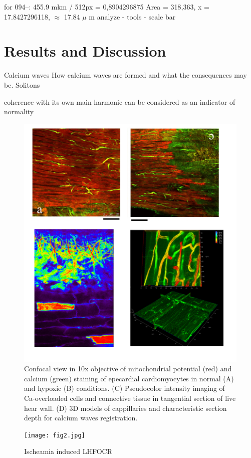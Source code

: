 \documentclass{biophys-new}
\begin{document}
for 094--: 455.9 mkm / 512px = 0,8904296875
Area = 318,363, x = 17.8427296118, $\approx$ 17.84 $\mu$ m
analyze - tools - scale bar


\section*{Results and Discussion}

Calcium waves
How calcium waves are formed and what the consequences may be.
Solitons

coherence with its own main harmonic can be considered as an indicator of normality

\begin{figure}[hbt!]
\centering
\includegraphics[width=0.8\linewidth]{fig1.png}
\caption{Confocal view in 10x objective of mitochondrial potential (red) and calcium (green) staining of epecardial cardiomyocytes in normal (A) and hypoxic (B) conditions. (C) Pseudocolor intensity imaging of Ca-overloaded cells and connective tissue in  tangential section of live hear wall. (D) 3D models of  cappillaries and characteristic section depth for calcium waves registration.}
\label{fig:fig1}
\end{figure}


\begin{figure}
    \texttt{[image: fig2.jpg]}
    \caption{Ischeamia induced LHFOCR}
    \label{fig:fig2}
\end{figure}
\end{document}
